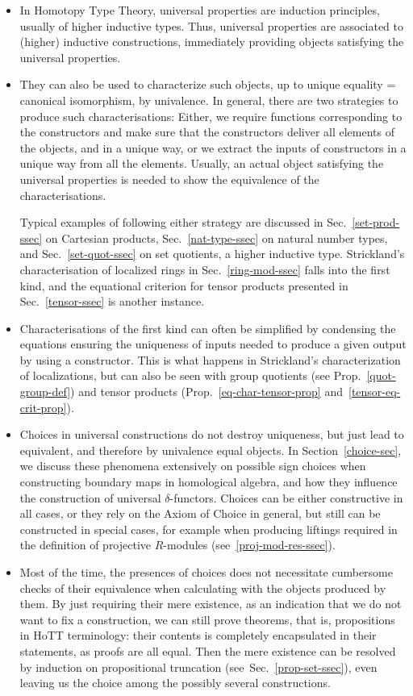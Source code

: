 \documentclass{amsart}
\theoremstyle{plain}
\numberwithin{equation}{section} %
\numberwithin{figure}{section} %
\theoremstyle{plain}
\theoremstyle{plain}
\theoremstyle{plain}
\theoremstyle{plain}
\theoremstyle{plain}
\theoremstyle{plain}
\theoremstyle{remark}
\theoremstyle{remark}
\theoremstyle{remark}
\begin{document}
\begin{itemize}
\item In Homotopy Type Theory, universal properties are induction principles, usually of higher inductive types. Thus, universal properties are associated to (higher) inductive constructions, immediately providing objects satisfying the universal properties. 
\item They can also be used to characterize such objects, up to unique equality = canonical isomorphism, by univalence. In general, there are two strategies to produce such characterisations: Either, we require functions corresponding to the constructors and make sure that the constructors deliver all elements of the objects, and in a unique way, or we extract the inputs of constructors in a unique way from all the elements. Usually, an actual object satisfying the universal properties is needed to show the equivalence of the characterisations.

 Typical examples of following either strategy are discussed in Sec.~\ref{set-prod-ssec} on Cartesian products, Sec.~\ref{nat-type-ssec} on natural number types, and Sec.~\ref{set-quot-ssec} on set quotients, a higher inductive type. Strickland's characterisation of localized rings in Sec.~\ref{ring-mod-ssec} falls into the first kind, and the equational criterion for tensor products presented in Sec.~\ref{tensor-ssec} is another instance.
\item Characterisations of the first kind can often be simplified by condensing the equations ensuring the uniqueness of inputs needed to produce a given output by using a constructor. This is what happens in Strickland's characterization of localizations, but can also be seen with group quotients (see Prop.~\ref{quot-group-def}) and tensor products (Prop.~\ref{eq-char-tensor-prop} and~\ref{tensor-eq-crit-prop}).
\item Choices in universal constructions do not destroy uniqueness, but just lead to equivalent, and therefore by univalence equal objects. In Section~\ref{choice-sec}, we discuss these phenomena extensively on possible sign choices when constructing boundary maps in homological algebra, and how they influence the construction of universal $\delta$-functors. Choices can be either constructive in all cases, or they rely on the Axiom of Choice in general, but still can be constructed in special cases, for example when producing liftings required in the definition of projective $R$-modules (see~\ref{proj-mod-res-ssec}).
\item Most of the time, the presences of choices does not necessitate cumbersome checks of their equivalence when calculating with the objects produced by them. By just requiring their mere existence, as an indication that we do not want to fix a construction, we can still prove theorems, that is, propositions in HoTT terminology: their contents is completely encapsulated in their statements, as proofs are all equal. Then the mere existence can be resolved by induction on propositional truncation (see~Sec.~\ref{prop-set-ssec}), even leaving us the choice among the possibly several constructions.


\end{itemize}
\end{document}
